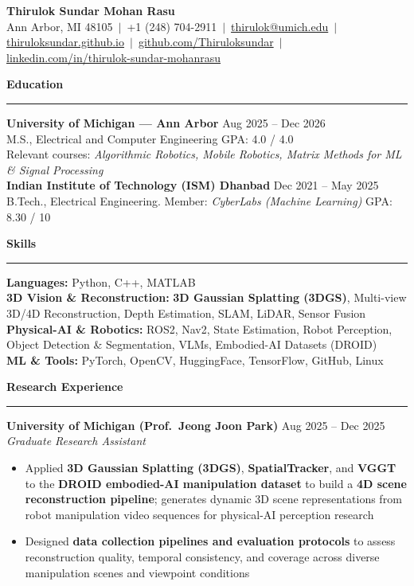 \documentclass[9pt]{article}
\newcommand{\sect}[1]{\vspace{4pt}\noindent\textbf{\large #1}\vspace{3pt}\hrule\vspace{6pt}}
\begin{document}
\begin{center}
  {\Large \textbf{Thirulok Sundar Mohan Rasu}}\\[3pt]
  Ann Arbor, MI 48105 $\,|\,$ +1 (248) 704-2911 $\,|\,$
  \href{mailto:thirulok@umich.edu}{thirulok@umich.edu} $\,|\,$
  \href{https://thiruloksundar.github.io}{thiruloksundar.github.io} $\,|\,$
  \href{https://github.com/Thiruloksundar}{github.com/Thiruloksundar} $\,|\,$
  \href{https://www.linkedin.com/in/thirulok-sundar-mohanrasu/}{linkedin.com/in/thirulok-sundar-mohanrasu}
\end{center}
\vspace{-3mm}

\sect{Education}
\textbf{University of Michigan --- Ann Arbor} \hfill Aug 2025 -- Dec 2026\\
M.S., Electrical and Computer Engineering \hfill GPA: 4.0 / 4.0\\
Relevant courses: \emph{Algorithmic Robotics, Mobile Robotics, Matrix Methods for ML \& Signal Processing}\\[5pt]
\textbf{Indian Institute of Technology (ISM) Dhanbad} \hfill Dec 2021 -- May 2025\\
B.Tech., Electrical Engineering. Member: \emph{CyberLabs (Machine Learning)} \hfill GPA: 8.30 / 10

\sect{Skills}
\textbf{Languages:} Python, C++, MATLAB\\
\textbf{3D Vision \& Reconstruction:} \textbf{3D Gaussian Splatting (3DGS)}, Multi-view 3D/4D Reconstruction, Depth Estimation, SLAM, LiDAR, Sensor Fusion\\
\textbf{Physical-AI \& Robotics:} ROS2, Nav2, State Estimation, Robot Perception, Object Detection \& Segmentation, VLMs, Embodied-AI Datasets (DROID)\\
\textbf{ML \& Tools:} PyTorch, OpenCV, HuggingFace, TensorFlow, GitHub, Linux

\sect{Research Experience}

\textbf{University of Michigan (Prof.\ Jeong Joon Park)} \hfill Aug 2025 -- Dec 2025\\
\emph{Graduate Research Assistant}
\vspace{-2mm}
\begin{itemize}[leftmargin=*,noitemsep,topsep=1pt]
  \item Applied \textbf{3D Gaussian Splatting (3DGS)}, \textbf{SpatialTracker}, and \textbf{VGGT} to the \textbf{DROID embodied-AI manipulation dataset} to build a \textbf{4D scene reconstruction pipeline}; generates dynamic 3D scene representations from robot manipulation video sequences for physical-AI perception research
  \item Designed \textbf{data collection pipelines and evaluation protocols} to assess reconstruction quality, temporal consistency, and coverage across diverse manipulation scenes and viewpoint conditions
\end{itemize}
\end{document}
